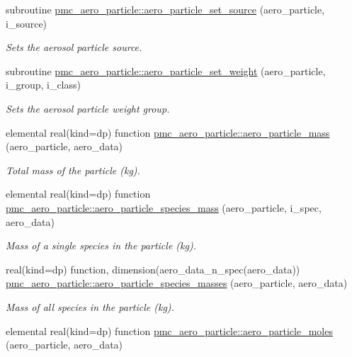 \begin{DoxyCompactItemize}
subroutine \mbox{\hyperlink{namespacepmc__aero__particle_aa8098a7e82dde71488ac2f4b69dd537c}{pmc\+\_\+aero\+\_\+particle\+::aero\+\_\+particle\+\_\+set\+\_\+source}} (aero\+\_\+particle, i\+\_\+source)
\begin{DoxyCompactList}\small\item\em Sets the aerosol particle source. \end{DoxyCompactList}\item 
subroutine \mbox{\hyperlink{namespacepmc__aero__particle_a2d9b838fc6ab2c7a82277a5e4d96f80f}{pmc\+\_\+aero\+\_\+particle\+::aero\+\_\+particle\+\_\+set\+\_\+weight}} (aero\+\_\+particle, i\+\_\+group, i\+\_\+class)
\begin{DoxyCompactList}\small\item\em Sets the aerosol particle weight group. \end{DoxyCompactList}\item 
elemental real(kind=dp) function \mbox{\hyperlink{namespacepmc__aero__particle_a2eb5867602c52d2c78e2780b53e50fa5}{pmc\+\_\+aero\+\_\+particle\+::aero\+\_\+particle\+\_\+mass}} (aero\+\_\+particle, aero\+\_\+data)
\begin{DoxyCompactList}\small\item\em Total mass of the particle (kg). \end{DoxyCompactList}\item 
elemental real(kind=dp) function \mbox{\hyperlink{namespacepmc__aero__particle_a00b00ef036460b7f4dea8d7f07631d41}{pmc\+\_\+aero\+\_\+particle\+::aero\+\_\+particle\+\_\+species\+\_\+mass}} (aero\+\_\+particle, i\+\_\+spec, aero\+\_\+data)
\begin{DoxyCompactList}\small\item\em Mass of a single species in the particle (kg). \end{DoxyCompactList}\item 
real(kind=dp) function, dimension(aero\+\_\+data\+\_\+n\+\_\+spec(aero\+\_\+data)) \mbox{\hyperlink{namespacepmc__aero__particle_a1aac7400fd1b12f736d460c540c8ae0f}{pmc\+\_\+aero\+\_\+particle\+::aero\+\_\+particle\+\_\+species\+\_\+masses}} (aero\+\_\+particle, aero\+\_\+data)
\begin{DoxyCompactList}\small\item\em Mass of all species in the particle (kg). \end{DoxyCompactList}\item 
elemental real(kind=dp) function \mbox{\hyperlink{namespacepmc__aero__particle_ad49b8be44f56a4b92ca2c1e589d33e3f}{pmc\+\_\+aero\+\_\+particle\+::aero\+\_\+particle\+\_\+moles}} (aero\+\_\+particle, aero\+\_\+data)

\end{DoxyCompactItemize}
